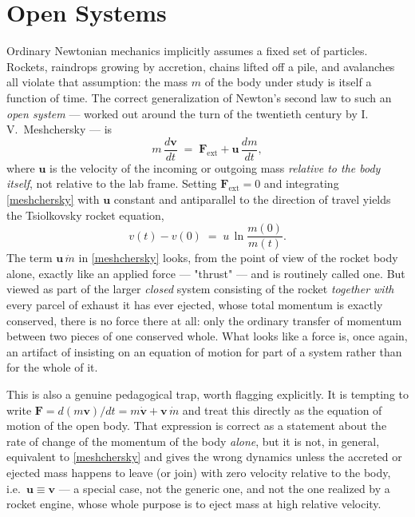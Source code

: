 \chapter{Open Systems}
\label{ch:open}

Ordinary Newtonian mechanics implicitly assumes a fixed set of
particles. Rockets, raindrops growing by accretion, chains lifted
off a pile, and avalanches all violate that assumption: the mass $m$
of the body under study is itself a function of time. The correct
generalization of Newton's second law to such an \emph{open system}
--- worked out around the turn of the twentieth century by
I.\,V.\ Meshchersky --- is
\begin{equation}
  m\,\frac{d\mathbf v}{dt} \;=\; \mathbf F_{\mathrm{ext}}
  + \mathbf u\,\frac{dm}{dt} ,
  \label{meshchersky}
\end{equation}
where $\mathbf u$ is the velocity of the incoming or outgoing mass
\emph{relative to the body itself}, not relative to the lab frame.
Setting $\mathbf F_{\mathrm{ext}}=0$ and integrating
\eqref{meshchersky} with $\mathbf u$ constant and antiparallel to
the direction of travel yields the Tsiolkovsky rocket equation,
\begin{equation}
  v(t) - v(0) \;=\; u\,\ln\frac{m(0)}{m(t)} .
  \label{tsiolkovsky}
\end{equation}
 The
term $\mathbf u\,\dot m$ in \eqref{meshchersky} looks, from the
point of view of the rocket body alone, exactly like an applied
force --- "thrust" --- and is routinely called one. But viewed as
part of the larger \emph{closed} system consisting of the rocket
\emph{together with} every parcel of exhaust it has ever ejected,
whose total momentum is exactly conserved, there is no force there
at all: only the ordinary transfer of momentum between two pieces of
one conserved whole. What looks like a force is, once again, an
artifact of insisting on an equation of motion for part of a system
rather than for the whole of it.

This is also a genuine pedagogical trap, worth flagging explicitly.
It is tempting to write $\mathbf F = d(m\mathbf v)/dt = m\dot{\mathbf
v} + \mathbf v\,\dot m$ and treat this directly as the equation of
motion of the open body. That expression is correct as a statement
about the rate of change of the momentum of the body \emph{alone},
but it is not, in general, equivalent to \eqref{meshchersky} and
gives the wrong dynamics unless the accreted or ejected mass happens
to leave (or join) with zero velocity relative to the body, i.e.\
$\mathbf u \equiv \mathbf v$ --- a special case, not the generic one,
and not the one realized by a rocket engine, whose whole purpose is
to eject mass at high relative velocity.


